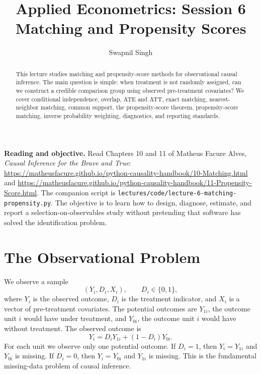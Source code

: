 

\title{Applied Econometrics: Session 6\\Matching and Propensity Scores}
\author{Swapnil Singh}
\date{}


\setlength{\headheight}{26pt}

\newcommand{\ATU}{\mathrm{ATU}}
\newcommand{\ps}{e(X)}
\newcommand{\ehat}{\widehat e(X)}


\maketitle

\begin{abstract}
This lecture studies matching and propensity-score methods for observational
causal inference. The main question is simple: when treatment is not randomly
assigned, can we construct a credible comparison group using observed
pre-treatment covariates? We cover conditional independence, overlap, ATE and
ATT, exact matching, nearest-neighbor matching, common support, the
propensity-score theorem, propensity-score matching, inverse probability
weighting, diagnostics, and reporting standards.
\end{abstract}

\begin{boxD}
\textbf{Reading and objective.} Read Chapters 10 and 11 of Matheus Facure
Alves, \emph{Causal Inference for the Brave and True}:
\url{https://matheusfacure.github.io/python-causality-handbook/10-Matching.html}
and
\url{https://matheusfacure.github.io/python-causality-handbook/11-Propensity-Score.html}.
The companion script is
\texttt{lectures/code/lecture-6-matching-propensity.py}. The objective is to
learn how to design, diagnose, estimate, and report a selection-on-observables
study without pretending that software has solved the identification problem.
\end{boxD}

\section{The Observational Problem}

We observe a sample
\[
    (Y_i,D_i,X_i),\qquad D_i\in\{0,1\},
\]
where \(Y_i\) is the observed outcome, \(D_i\) is the treatment indicator, and
\(X_i\) is a vector of pre-treatment covariates. The potential outcomes are
\(Y_{1i}\), the outcome unit \(i\) would have under treatment, and \(Y_{0i}\),
the outcome unit \(i\) would have without treatment. The observed outcome is
\[
    Y_i = D_iY_{1i} + (1-D_i)Y_{0i}.
\]
For each unit we observe only one potential outcome. If \(D_i=1\), then
\(Y_i=Y_{1i}\) and \(Y_{0i}\) is missing. If \(D_i=0\), then \(Y_i=Y_{0i}\) and
\(Y_{1i}\) is missing. This is the fundamental missing-data problem of causal
inference.

